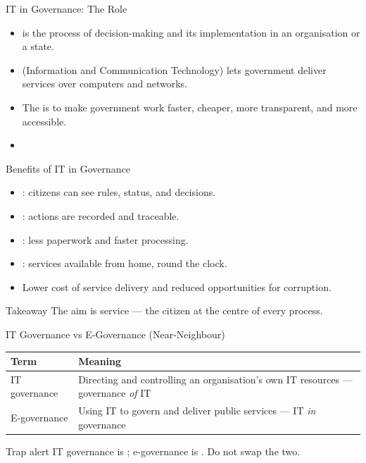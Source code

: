 \documentclass[aspectratio=169]{beamer}
\begin{document}
\begin{frame}{IT in Governance: The Role}
  \begin{itemize}
    \item {} is the process of decision-making and its
      implementation in an organisation or a state.
    \item {} (Information and Communication Technology) lets government
      deliver services over computers and networks.
    \item The  is to make government work
      faster, cheaper, more transparent, and more accessible.
    \item {}
  \end{itemize}
\end{frame}

\begin{frame}{Benefits of IT in Governance}
  \begin{itemize}
    \item {}: citizens can see rules, status, and decisions.
    \item {}: actions are recorded and traceable.
    \item {}: less paperwork and faster processing.
    \item {}: services available from home, round the clock.
    \item Lower cost of service delivery and reduced opportunities for
      corruption.
  \end{itemize}
  \begin{alertblock}{Takeaway}
    The aim is  service --- the citizen at the centre of
    every process.
  \end{alertblock}
\end{frame}

\begin{frame}{IT Governance vs E-Governance (Near-Neighbour)}
  \begin{center}
    \begin{tabular}{p{}p{}}
      \toprule
      \textbf{Term} & \textbf{Meaning} \\
      \midrule
      IT governance & Directing and controlling an organisation's own IT
        resources --- governance \emph{of} IT \\
      E-governance & Using IT to govern and deliver public services --- IT
        \emph{in} governance \\
      \bottomrule
    \end{tabular}
  \end{center}
  \vspace{0.3cm}
  \begin{alertblock}{Trap alert}
    IT governance is ; e-governance is . Do not swap the two.
  \end{alertblock}
\end{frame}
\end{document}
